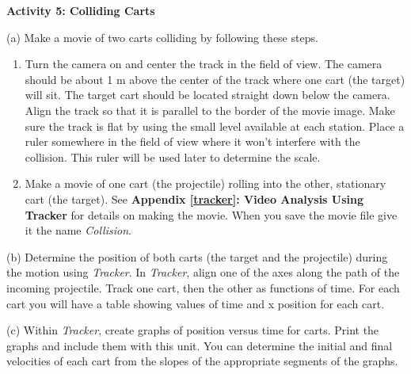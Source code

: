 \vspace{10mm}

\textbf{Activity 5: Colliding Carts }

(a) Make a movie of two carts colliding by following these steps. 

\begin{enumerate}
\item Turn the camera on and center the track in the field of view. The camera should
be about 1 m above the center of the track where one cart (the target) will
sit. The target cart should be located straight down below the camera. Align the track so that it is parallel to the border of the movie image. Make sure the track is flat by using the small level available at each station. Place a ruler somewhere in the field of view where it won't interfere with the collision. This ruler will be used later to determine the scale. 
\item Make a movie of one cart (the projectile) rolling into the other, stationary
cart (the target). See \textbf{Appendix \ref{tracker}: Video Analysis Using Tracker} for details on making
the movie. When you save the movie file give it the name \textit{Collision}.
\end{enumerate}
(b) Determine the position of both carts (the target and the projectile) during
the motion using \textit{Tracker}. In \textit{Tracker}, align one of the axes along the path 
of the incoming projectile. Track one cart, then the other as functions of time. For each cart 
you will have a table showing values of time and x position for each cart.

(c) Within \textit{Tracker}, create graphs of position versus time for carts. Print the graphs and include them with this unit. You can determine the initial and final velocities 
of each cart from the slopes of the appropriate segments of the graphs.

